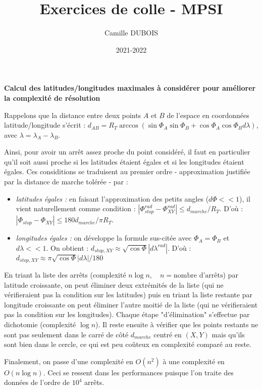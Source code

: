 \documentclass[12pt,oneside]{article}
\title{Exercices de colle - MPSI}
\author{Camille DUBOIS}
\date{2021-2022}
\begin{document}
\maketitle

\tableofcontents


\textbf{Calcul des latitudes/longitudes maximales à considérer pour améliorer la complexité de résolution}

Rappelons que la distance entre deux points $A$ et $B$ de l'espace en coordonnées latitude/longitude s'écrit : $d_{AB} = R_T \arccos ( \sin \Phi_A \sin \Phi_B + \cos \Phi_A \cos \Phi_B d \lambda)$, avec $\lambda = \lambda_A - \lambda_B$.

Ainsi, pour avoir un arrêt assez proche du point considéré, il faut en particulier qu'il soit aussi proche si les latitudes étaient égales et si les longitudes étaient égales. Ces considitions se traduisent au premier ordre - approximation justifiée par la distance de marche tolérée - par :
\begin{itemize}
    \item \textit{latitudes égales : } en faisant l'approximation des petits angles ($d \Phi << 1$), il vient naturellement comme condition : $|\Phi^{rad}_{stop} - \Phi^{rad}_{XY}| \leq d_{marche}/R_T$. D'où : $|\Phi_{stop} - \Phi_{XY}| \leq 180 d_{marche}/\pi R_T$.
    \item \textit{longitudes égales : } on développe la formule sus-citée avec $\Phi_A = \Phi_B$ et $d\lambda << 1$. On obtient : $d_{stop, XY} \approx \sqrt{\cos \Phi} |d\lambda^{rad}|$. D'où : $d_{stop, XY} \approx \pi \sqrt{\cos \Phi} |d\lambda|/180$
\end{itemize}

En triant la liste des arrêts (complexité $n \log n, \quad n = \text{nombre d'arrêts}$) par latitude croissante, on peut éliminer deux extrémités de la liste (qui ne vérifieraient pas la condition sur les latitudes) puis en triant la liste restante par longitude croissante on peut éliminer l'autre moitié de la liste (qui ne vérifieraient pas la condition sur les longitudes). Chaque étape "d'élimination" s'effectue par dichotomie (complexité $\log n$). Il reste ensuite à vérifier que les points restants ne sont pas seulement dans le carré de côté $d_{marche}$ centré en $(X, Y)$ mais qu'ils sont bien dans le cercle, ce qui est peu coûteux en complexité comparé au reste.

Finalement, on passe d'une complexité en $O(n^2)$ à une complexité en $O(n \log n)$. Ceci se ressent dans les performances puisque l'on traite des données de l'ordre de $10^4$ arrêts.
\end{document}
